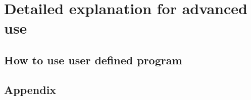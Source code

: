\documentclass[a4paper]{report}
\begin{document}
\part{Detailed explanation for advanced use} \label{part:advance_use}
%  

 \chapter{How to use user defined program}
%  
%  
%  

%  




\begin{appendix}
\part{Appendix}
% 
% 
\end{appendix}


\ClearWallPaper

\end{document}
